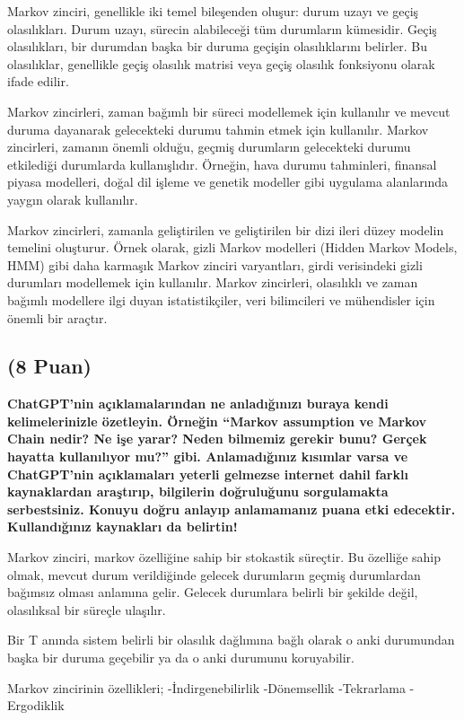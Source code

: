 \documentclass[11pt]{article}
\begin{document}
Markov zinciri, genellikle iki temel bileşenden oluşur: durum uzayı ve geçiş olasılıkları. Durum uzayı, sürecin alabileceği tüm durumların kümesidir. Geçiş olasılıkları, bir durumdan başka bir duruma geçişin olasılıklarını belirler. Bu olasılıklar, genellikle geçiş olasılık matrisi veya geçiş olasılık fonksiyonu olarak ifade edilir.

Markov zincirleri, zaman bağımlı bir süreci modellemek için kullanılır ve mevcut duruma dayanarak gelecekteki durumu tahmin etmek için kullanılır. Markov zincirleri, zamanın önemli olduğu, geçmiş durumların gelecekteki durumu etkilediği durumlarda kullanışlıdır. Örneğin, hava durumu tahminleri, finansal piyasa modelleri, doğal dil işleme ve genetik modeller gibi uygulama alanlarında yaygın olarak kullanılır.

Markov zincirleri, zamanla geliştirilen ve geliştirilen bir dizi ileri düzey modelin temelini oluşturur. Örnek olarak, gizli Markov modelleri (Hidden Markov Models, HMM) gibi daha karmaşık Markov zinciri varyantları, girdi verisindeki gizli durumları modellemek için kullanılır. Markov zincirleri, olasılıklı ve zaman bağımlı modellere ilgi duyan istatistikçiler, veri bilimcileri ve mühendisler için önemli bir araçtır.

\subsection{(8 Puan)} \textbf{ChatGPT’nin açıklamalarından ne anladığınızı buraya kendi kelimelerinizle özetleyin. Örneğin ``Markov assumption ve Markov Chain nedir? Ne işe yarar? Neden bilmemiz gerekir bunu? Gerçek hayatta kullanılıyor mu?'' gibi. Anlamadığınız kısımlar varsa ve ChatGPT’nin açıklamaları yeterli gelmezse internet dahil farklı kaynaklardan araştırıp, bilgilerin doğruluğunu sorgulamakta serbestsiniz. Konuyu doğru anlayıp anlamamanız puana etki edecektir. Kullandığınız kaynakları da belirtin!}

Markov zinciri, markov özelliğine sahip bir stokastik süreçtir. Bu özelliğe sahip olmak, mevcut durum verildiğinde gelecek durumların geçmiş durumlardan bağımsız olması anlamına gelir. Gelecek durumlara belirli bir şekilde değil, olasılıksal bir süreçle ulaşılır.

Bir T anında sistem belirli bir olasılık dağlımına bağlı olarak o anki durumundan başka bir duruma geçebilir ya da o anki durumunu koruyabilir.

Markov zincirinin özellikleri;
-İndirgenebilirlik
-Dönemsellik
-Tekrarlama
-Ergodiklik
\end{document}
